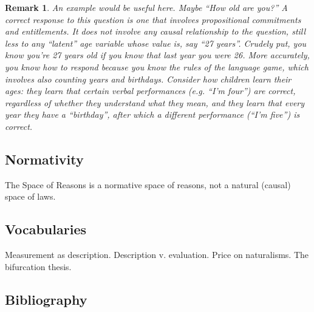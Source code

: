 \documentclass[11pt,twoside]{article}
\newtheorem{remark}{Remark}
\begin{document}
\begin{remark}
  An example would be useful here.  Maybe ``How old are you?''  A
  correct response to this question is one that involves propositional
  commitments and entitlements.  It does not involve any causal
  relationship to the question, still less to any ``latent'' age
  variable whose value is, say ``27 years''.  Crudely put, you know
  you're 27 years old if you know that last year you were 26.  More
  accurately, you know \textit{how} to respond because you know the
  rules of the language game, which involves also counting years and
  birthdays.  Consider how children learn their ages: they learn that
  certain verbal performances (e.g. ``I'm four'') are correct,
  regardless of whether they understand what they mean, and they learn
  that every year they have a ``birthday'', after which a different
  performance (``I'm five'') is correct.
\end{remark}

\subsection{Normativity}

The Space of Reasons is a normative space of reasons, not a natural
(causal) space of laws.

\subsection{Vocabularies}

Measurement as description.  Description v. evaluation.  Price on
naturalisms.  The bifurcation thesis.


\subsection{Bibliography}
\end{document}
